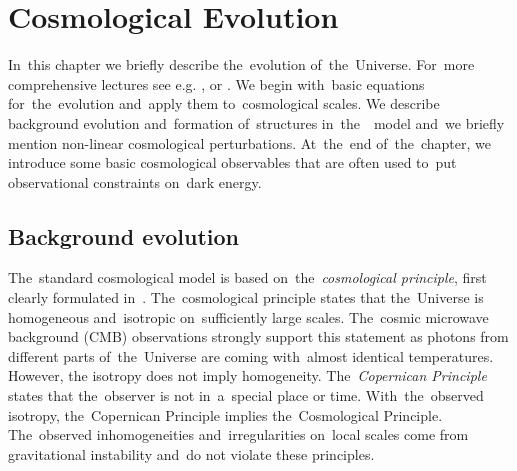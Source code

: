\chapter{Cosmological Evolution}
\label{chpt:cosmo_evol}
In~this chapter we briefly describe the~evolution of~the~Universe. For~more comprehensive lectures see e.g. \textcite{Ref:Weinberg}, \textcite{2002col.luc..cosmology} or \textcite{2010deto.book.....A}. We begin with~basic equations for~the~evolution and~apply them to~cosmological scales. We describe background evolution and~formation of~structures in~the~\LCDM\ model and~we briefly mention non-linear cosmological perturbations. At~the~end of~the~chapter, we introduce some basic cosmological observables that are often used to~put observational constraints on~dark energy.

\section{Background evolution}
The~standard cosmological model is based on~the~\textit{cosmological principle}, first clearly formulated in~\textcite{1687pnpm.book.....N}. The~cosmological principle states that the~Universe is homogeneous and~isotropic on~sufficiently large scales. The~cosmic microwave background (CMB) observations strongly support this statement as photons from different parts of~the~Universe are coming with~almost identical temperatures. However, the isotropy does not imply homogeneity. The~\textit{Copernican Principle} states that the~observer is not in~a~special place or time. With~the~observed isotropy, the~Copernican Principle implies the~Cosmological Principle. The~observed inhomogeneities and~irregularities on~local scales come from gravitational instability and~do not violate these principles.








